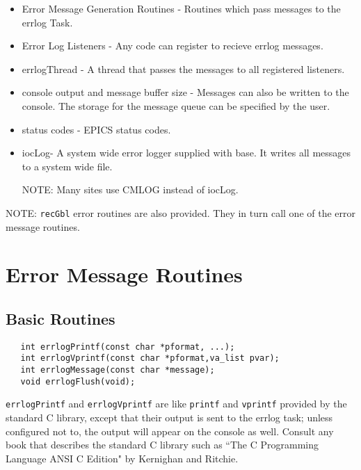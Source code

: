 \begin{itemize}
\item Error Message Generation Routines - Routines which pass messages to the errlog Task.

\item Error Log Listeners - Any code can register to recieve errlog messages.

\item errlogThread - A thread that passes the messages to all registered listeners.

\item console output and message buffer size - Messages can also be written to the console.
The storage for the message queue can be specified by the user.

\item status codes - EPICS status codes.

\item iocLog- A system wide error logger supplied with base.
It writes all messages to a system wide file.

NOTE: Many sites use CMLOG instead of iocLog.

\end{itemize}

NOTE: \verb|recGbl| error routines are also provided.
They in turn call one of the error message routines.

\section{Error Message Routines}

\subsection{Basic Routines}

\begin{verbatim}
   int errlogPrintf(const char *pformat, ...);
   int errlogVprintf(const char *pformat,va_list pvar);
   int errlogMessage(const char *message);
   void errlogFlush(void);
\end{verbatim}
\verb|errlogPrintf| and  \verb|errlogVprintf| are like \verb|printf| and \verb|vprintf| provided by the standard C library, except that their output is sent to the errlog task; unless configured not to, the output will appear on the console as well.
Consult any book that describes the standard C library such as ``The C Programming Language ANSI C Edition" by Kernighan and Ritchie.

